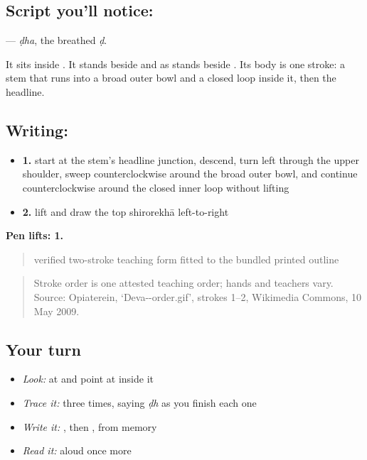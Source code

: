 \subsection*{Script you'll notice: }
\textbf{} — \emph{ḍha}, the breathed \emph{ḍ}.

It sits inside \textbf{}. It stands beside \textbf{} and \textbf{} as \textbf{} stands beside \textbf{}. Its body is one stroke: a stem that runs into a broad outer bowl and a closed loop inside it, then the headline.

\subsection*{Writing: }

\begin{itemize}
\raggedright
  \item \textbf{1.} start at the stem's headline junction, descend, turn left through the upper shoulder, sweep counterclockwise around the broad outer bowl, and continue counterclockwise around the closed inner loop without lifting
  \item \textbf{2.} lift and draw the top shirorekhā left-to-right
\end{itemize}

\textbf{Pen lifts: 1.}

\begin{quote}
verified two-stroke teaching form fitted to the bundled printed outline
\end{quote}

\begin{quote}
Stroke order is one attested teaching order; hands and teachers vary. Source: Opiaterein, ‘Deva--order.gif’, strokes 1–2, Wikimedia Commons, 10 May 2009.
\end{quote}

\subsection*{Your turn}
\begin{itemize}
\raggedright
  \item \emph{Look:} at \textbf{} and point at  inside it
  \item \emph{Trace it:}  three times, saying \emph{ḍh} as you finish each one
  \item \emph{Write it:} , then , from memory
  \item \emph{Read it:} \textbf{} aloud once more
\end{itemize}

